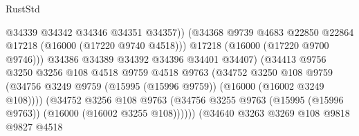 \begin{lexlean}{RustStd}
\begin{coremodule}
                                            @34339
                                            @34342
                                            @34346
                                            @34351
                                            @34357))
                                        (@34368
                                          @9739
                                          @4683
                                          @22850
                                          @22864
                                          @17218
                                          (@16000 (@17220 @9740 @4518)))
                                        @17218
                                        (@16000 (@17220 @9700 @9746)))
                                      @34386
                                      @34389
                                      @34392
                                      @34396
                                      @34401
                                      @34407)
                                    (@34413
                                      @9756
                                      @3250
                                      @3256
                                      @108
                                      @4518
                                      @9759
                                      @4518
                                      @9763
                                      (@34752
                                        @3250
                                        @108
                                        @9759
                                        (@34756
                                          @3249
                                          @9759
                                          (@15995 (@15996 @9759))
                                          (@16000 (@16002 @3249 @108))))
                                      (@34752
                                        @3256
                                        @108
                                        @9763
                                        (@34756
                                          @3255
                                          @9763
                                          (@15995 (@15996 @9763))
                                          (@16000 (@16002 @3255 @108))))))
                                  (@34640
                                    @3263
                                    @3269
                                    @108
                                    @9818
                                    @9827
                                    @4518

\end{coremodule}
\end{lexlean}
